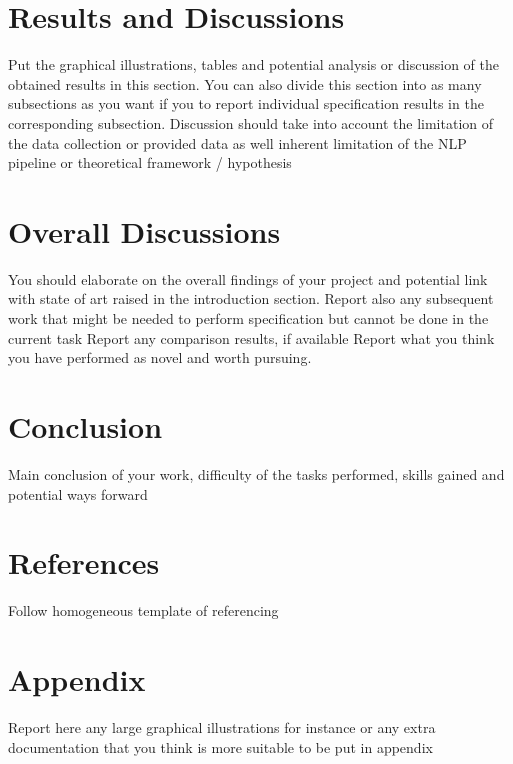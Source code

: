 \documentclass[conference]{IEEEtran}
\begin{document}
\section{Results and Discussions}
Put the graphical illustrations, tables and potential analysis or discussion of the obtained results in this section.
You can also divide this section into as many subsections as you want if you to report individual specification results in the corresponding subsection. Discussion should take into account the limitation of the data collection or provided data as well inherent limitation of the NLP pipeline or theoretical framework / hypothesis

\section{Overall Discussions}
You should elaborate on the overall findings of your project and potential link with state of art raised in the introduction section. Report also any subsequent work that might be needed to perform specification but cannot be done in the current task
Report any comparison results, if available
Report what you think you have performed as novel and worth pursuing.

\section{Conclusion}
Main conclusion of your work, difficulty of the tasks performed, skills gained and potential ways forward

\section*{References}
Follow homogeneous template of referencing

\section*{Appendix}
Report here any large graphical illustrations for instance or any extra documentation that you think is more suitable to be put in appendix
\end{document}
